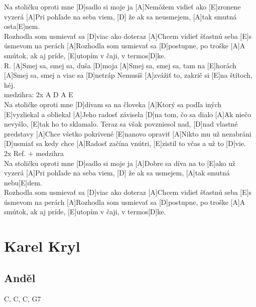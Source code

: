 \documentclass[10pt]{article}
\begin{document}
\begin{Large}
\begin{minipage}{\textwidth}
\begin{multicols}{2}
\begin{guitar}
	[A]Na stoličku oproti mne [D]sadlo si moje ja
	[A]Nemôžem vidieť ako [E]zronene vyzerá
	[A]Pri pohľade na seba viem, 
	[D] že ak sa neusmejem,
	[A]tak smutná osta[E]nem.
	\\
	[A]Rozhodla som usmievať sa [D]viac ako doteraz
	[A]Chcem vidieť šťastnú seba 
	[E]s úsmevom na perách
	[A]Rozhodla som usmievať sa 
	[D]postupne, po troške
	[A]A smútok, ak aj príde, 
	[E]utopím v čaji, v termos[D]ke.
	\\
	R.
	[A]Smej sa, smej sa, duša [D]moja
	[A]Smej sa, smej sa, tam na [E]horách
	[A]Smej sa, smej a viac sa [D]netráp
	Nemusíš [A]zvážiť to, zakrič si [E]na štítoch, héj.
	\\
	medzihra: 2x A D A E
	\\
	[A]Na stoličke oproti mne [D]dívam sa na človeka
	[A]Ktorý sa podľa iných [E]vyzliekal a obliekal
	[A]Jeho radosť závisela [D]na tom, čo sa dialo
	[A]Ak niečo nevyšlo, [E]tak ho to sklamalo.
	\columnbreak
	[A]Teraz sa však povzniesol nad, 
	[D]nad vlastné predstavy
	[A]Chce všetko pokrivené [E]nanovo opraviť
	[A]Nikto mu už nezabráni [D]usmiať sa kedy chce
	[A]Radosť začína vnútri, 
	[E]zistil to včas a už to [D]vie.
	\\
	2x Ref. + medzihra
	\\
	[A]Na stoličku oproti mne [D]sadlo si moje ja
	[A]Dobre sa díva na to [E]ako už vyzerá
	[A]Pri pohľade na seba viem, 
	[D] že ak sa usmejem,
	[A]tak smutná nebu[E]dem.
	\\
	[A]Rozhodla som usmievať sa [D]viac ako doteraz
	[A]Chcem vidieť šťastnú seba 
	[E]s úsmevom na perách
	[A]Rozhodla som usmievať sa 
	[D]postupne, po troške
	[A]A smútok, ak aj príde, 
	[E]utopím v čaji, v termos[D]ke.
\end{guitar}
\end{multicols}
\end{minipage}

\section{Karel Kryl}

\begin{minipage}{\textwidth}
\subsection{Anděl}
\begin{multicols}{2}
\begin{guitar}
	C, C, C, G7
	

\end{guitar}
\end{multicols}
\end{minipage}
\end{Large}
\end{document}

